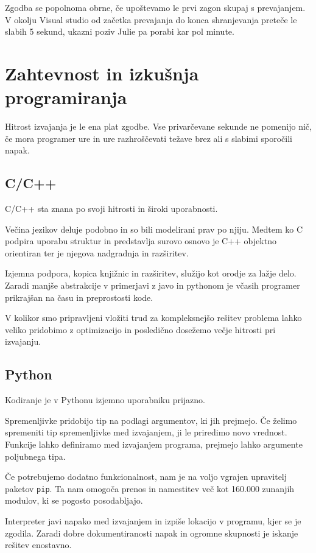 \documentclass[journal,a4paper,twoside]{sty/IEEEtran}
\begin{document}
Zgodba se popolnoma obrne, če upoštevamo le prvi zagon skupaj s prevajanjem.
V okolju Visual studio od začetka prevajanja do konca shranjevanja preteče le slabih 5 sekund, ukazni poziv Julie pa porabi kar pol minute.

\section{Zahtevnost in izkušnja programiranja}

Hitrost izvajanja je le ena plat zgodbe.
Vse privarčevane sekunde ne pomenijo nič, če mora programer ure in ure razhroščevati težave brez ali s slabimi sporočili napak.

\subsection{C/C++}

C/C++ sta znana po svoji hitrosti in široki uporabnosti.

Večina jezikov deluje podobno in so bili modelirani prav po njiju.
Medtem ko C podpira uporabu struktur in predstavlja surovo osnovo je C++ objektno orientiran ter je njegova nadgradnja in razširitev. 

Izjemna podpora, kopica knjižnic in razširitev, služijo kot orodje za lažje delo.
Zaradi manjše abstrakcije v primerjavi z javo in pythonom je včasih programer prikrajšan na času in preprostosti kode.

V kolikor smo pripravljeni vložiti trud za kompleksnejšo rešitev problema lahko veliko pridobimo z optimizacijo in posledično dosežemo večje hitrosti pri
	izvajanju.

\subsection{Python}

Kodiranje je v Pythonu izjemno uporabniku prijazno.

Spremenljivke pridobijo tip na podlagi argumentov, ki jih prejmejo.
Če želimo spremeniti tip spremenljivke med izvajanjem, ji le priredimo novo vrednost.
Funkcije lahko definiramo med izvajanjem programa, prejmejo lahko argumente poljubnega tipa.

Če potrebujemo dodatno funkcionalnost, nam je na voljo vgrajen upravitelj paketov \texttt{pip}.
Ta nam omogoča prenos in namestitev več kot 160.000 zunanjih modulov, ki se pogosto posodabljajo.

Interpreter javi napako med izvajanjem in izpiše lokacijo v programu, kjer se je zgodila.
Zaradi dobre dokumentiranosti napak in ogromne skupnosti je iskanje rešitev enostavno.
\end{document}
